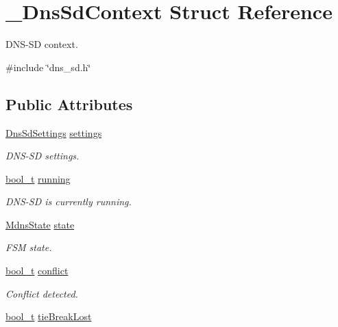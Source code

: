 \hypertarget{struct__DnsSdContext}{}\section{\+\_\+\+Dns\+Sd\+Context Struct Reference}
\label{struct__DnsSdContext}


D\+N\+S-\/\+SD context.  




{\ttfamily \#include \char`\"{}dns\+\_\+sd.\+h\char`\"{}}

\subsection*{Public Attributes}
\begin{DoxyCompactItemize}
\item 
\hyperlink{structDnsSdSettings}{Dns\+Sd\+Settings} \hyperlink{struct__DnsSdContext_a83854c45c02af3c5d28b81f33800c523}{settings}
\begin{DoxyCompactList}\small\item\em D\+N\+S-\/\+SD settings. \end{DoxyCompactList}\item 
\hyperlink{compiler__port_8h_a812d16e5494522586b3784e55d479912}{bool\+\_\+t} \hyperlink{struct__DnsSdContext_a66e7dca1a086af68de08bd998649dd35}{running}
\begin{DoxyCompactList}\small\item\em D\+N\+S-\/\+SD is currently running. \end{DoxyCompactList}\item 
\hyperlink{mdns__responder_8h_a96ee67ecc8252ba576e72c97cd8f7fd3}{Mdns\+State} \hyperlink{struct__DnsSdContext_af0a7dc8fa888e2e53b530d33ab7f1dfe}{state}
\begin{DoxyCompactList}\small\item\em F\+SM state. \end{DoxyCompactList}\item 
\hyperlink{compiler__port_8h_a812d16e5494522586b3784e55d479912}{bool\+\_\+t} \hyperlink{struct__DnsSdContext_ad7dc69e9252bbd856e866c93d9de9de6}{conflict}
\begin{DoxyCompactList}\small\item\em Conflict detected. \end{DoxyCompactList}\item 
\hyperlink{compiler__port_8h_a812d16e5494522586b3784e55d479912}{bool\+\_\+t} \hyperlink{struct__DnsSdContext_a51005b2d2c528162ee876e596d8e0c28}{tie\+Break\+Lost}

\end{DoxyCompactItemize}
